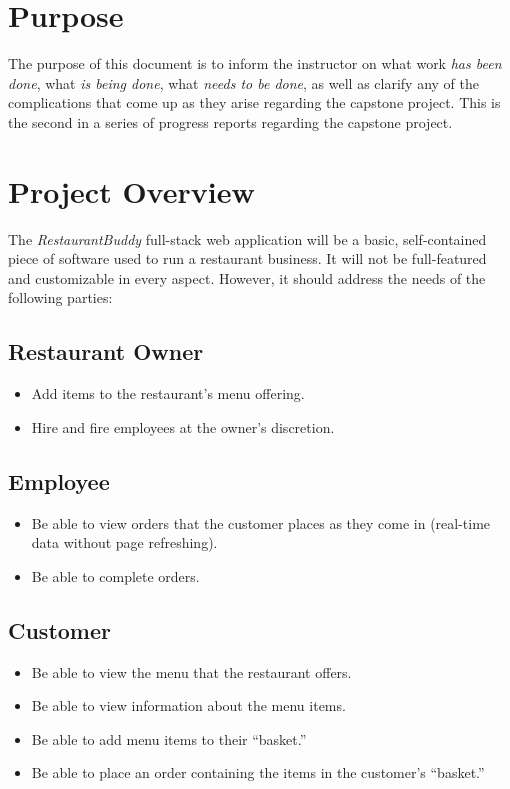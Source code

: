 \documentclass[letterpaper,11pt]{../../templates/texMemo}
\begin{document}
    \maketitle


    \section{Purpose}
    The purpose of this document is to inform the instructor on what work \textit{has been done}, what \textit{is being done}, what \textit{needs to be done}, as well as clarify any of the complications that come up as they arise regarding the capstone project. This is the second in a series of progress reports regarding the capstone project.


    \section{Project Overview}
    The \textit{RestaurantBuddy} full-stack web application will be a basic, self-contained piece of software used to run a restaurant business. It will not be full-featured and customizable in every aspect. However, it should address the needs of the following parties:

    \subsection{Restaurant Owner}
    \begin{itemize}
        \item Add items to the restaurant's menu offering.
        \item Hire and fire employees at the owner's discretion.
    \end{itemize}

    \subsection{Employee}
    \begin{itemize}
        \item Be able to view orders that the customer places as they come in (real-time data without page refreshing).
        \item Be able to complete orders.
    \end{itemize}

    \subsection{Customer}
    \begin{itemize}
        \item Be able to view the menu that the restaurant offers.
        \item Be able to view information about the menu items.
        \item Be able to add menu items to their ``basket.''
        \item Be able to place an order containing the items in the customer's ``basket.''
    \end{itemize}
\end{document}
